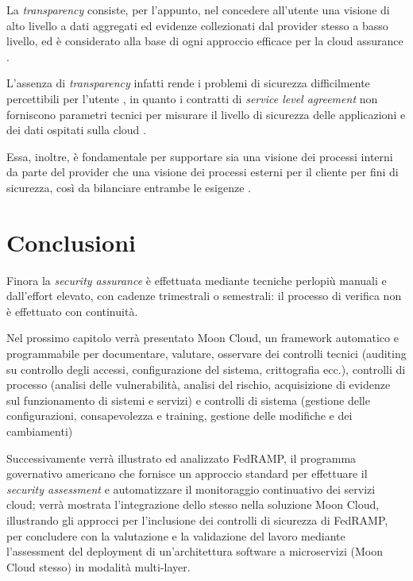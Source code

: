 \documentclass[../main.tex]{subfiles}
\begin{document}
La \textit{transparency} consiste, per l'appunto, nel concedere all'utente una visione di alto livello a dati aggregati ed evidenze collezionati dal provider stesso a basso livello, ed è considerato alla base di ogni approccio efficace per la cloud assurance \cite{6814039} \cite{6375614}.


L'assenza di \textit{transparency} infatti rende i problemi di sicurezza difficilmente percettibili per l'utente \cite{Ardagna:2015:SAC:2808687.2767005}, in quanto i contratti di \textit{service level agreement} non forniscono parametri tecnici per misurare il livello di sicurezza delle applicazioni e dei dati ospitati sulla cloud \cite{6684427}.

Essa, inoltre, è fondamentale per supportare sia una visione dei processi interni da parte del provider che una visione dei processi esterni per il cliente per fini di sicurezza, così da bilanciare entrambe le esigenze \cite{Ardagna:2015:SAC:2808687.2767005}.

\section{Conclusioni}

Finora la \textit{security assurance} è effettuata mediante tecniche perlopiù manuali e dall'effort elevato, con cadenze trimestrali o semestrali: il processo di verifica non è effettuato con continuità.

Nel prossimo capitolo verrà presentato Moon Cloud, un framework automatico e programmabile per documentare, valutare, osservare dei controlli tecnici (auditing su controllo degli accessi, configurazione del sistema, crittografia ecc.), controlli di processo (analisi delle vulnerabilità, analisi del rischio, acquisizione di evidenze sul funzionamento di sistemi e servizi) e controlli di sistema (gestione delle configurazioni, consapevolezza e training, gestione delle modifiche e dei cambiamenti)


Successivamente verrà illustrato ed analizzato FedRAMP, il programma governativo americano che fornisce un approccio standard per effettuare il \textit{security assessment} e automatizzare il monitoraggio continuativo dei servizi cloud; verrà mostrata l'integrazione dello stesso nella soluzione Moon Cloud, illustrando gli approcci per l'inclusione dei controlli di sicurezza di FedRAMP, per concludere con la valutazione e la validazione del lavoro mediante l'assessment del deployment di un'architettura software a microservizi (Moon Cloud stesso) in modalità multi-layer.
\end{document}
